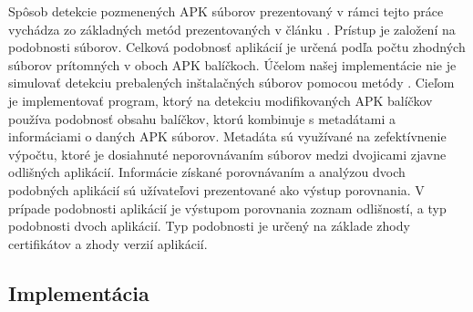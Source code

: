Spôsob detekcie pozmenených APK súborov prezentovaný v rámci tejto práce vychádza zo základných metód prezentovaných v článku . Prístup je založení na podobnosti súborov. Celková podobnosť aplikácií je určená podľa počtu zhodných súborov prítomných v oboch APK balíčkoch. Účelom našej implementácie nie je simulovať detekciu prebalených inštalačných súborov pomocou metódy . Cieľom je implementovať program, ktorý na detekciu modifikovaných APK balíčkov používa podobnosť obsahu balíčkov, ktorú kombinuje s metadátami a informáciami o daných APK súborov. Metadáta sú využívané na zefektívnenie výpočtu, ktoré je dosiahnuté neporovnávaním súborov medzi dvojicami zjavne odlišných aplikácií. Informácie získané porovnávaním a analýzou dvoch podobných aplikácií sú užívateľovi prezentované ako výstup porovnania. V prípade podobnosti aplikácií je výstupom porovnania zoznam odlišností, a typ podobnosti dvoch aplikácií. Typ podobnosti je určený na základe zhody certifikátov a zhody verzií aplikácií. 

\subsection{Implementácia}

